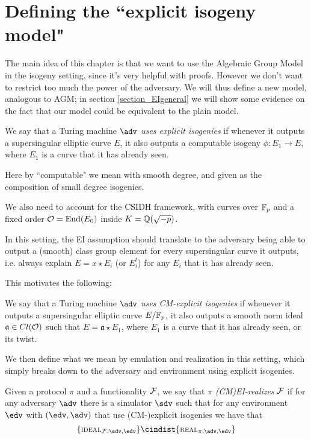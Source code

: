 \section{Defining the ``explicit isogeny model"}
The main idea of this chapter is that we want to use the Algebraic Group Model in the isogeny setting, since it's very helpful with proofs. However we don't want to restrict too much the power of the adversary. We will thus define a new model, analogous to AGM; in section \ref{section_EIgeneral} we will show some evidence on the fact that our model could be equivalent to the plain model.

\begin{definition}
    We say that a Turing machine $\adv$ \emph{uses explicit isogenies} if whenever it outputs a supersingular elliptic curve $E$, it also outputs a computable isogeny $\phi:E_1\to E$, where $E_1$ is a curve that it has already seen.
\end{definition}

Here by ``computable" we mean with smooth degree, and given as the composition of small degree isogenies.

We also need to account for the CSIDH framework, with curves over $\mathbb{F}_p$ and a fixed order $\mathcal{O}=\operatorname{End}(E_0)$ inside $K=\mathbb{Q}(\sqrt{-p})$.

In this setting, the EI assumption should translate to the adversary being able to output a (smooth) class group element for every supersingular curve it outputs, i.e. always explain $E=x\star E_i$ (or $E_i^t$) for any $E_i$ that it has already seen.

This motivates the following:

\begin{definition}
    We say that a Turing machine $\adv$ \emph{uses CM-explicit isogenies} if whenever it outputs a supersingular elliptic curve $E/\mathbb{F}_p$, it also outputs a smooth norm ideal $\mathfrak a\in Cl(\mathcal{O})$ such that $E=\mathfrak a\star E_1$, where $E_1$ is a curve that it has already seen, or its twist.
\end{definition}

We then define what we mean by emulation and realization in this setting, which simply breaks down to the adversary and environment using explicit isogenies.

\begin{definition}
        Given a protocol $\pi$ and a functionality $\mathcal{F}$, we say that $\pi$ \emph{(CM)EI-realizes} $\mathcal{F}$ if for any adversary $\adv$ there is a simulator $\sdv$ such that for any environment $\edv$ with $(\edv,\adv)$ that use (CM-)explicit isogenies we have that
    $$\{\textsc{\scriptsize IDEAL}_{\Fun,\sdv,\edv} \} \cindist \{\textsc{\scriptsize REAL}_{\pi,\adv,\edv} \}$$
\end{definition}


